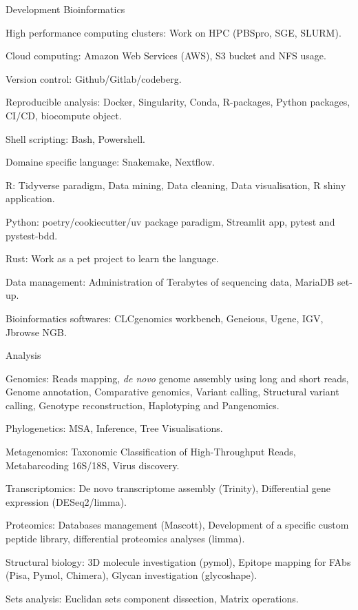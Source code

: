 \begin{cventries}
  \cventry
    {Development} %
    {Bioinformatics} %
    {} %
    {} %
    {
      \begin{cvitems} %
        \item {High performance computing clusters: Work on HPC (PBSpro, SGE, SLURM).}
        \item {Cloud computing: Amazon Web Services (AWS), S3 bucket and NFS usage.}
        \item {Version control: Github/Gitlab/codeberg.}
        \item {Reproducible analysis: Docker, Singularity, Conda, R-packages, Python packages, CI/CD, biocompute object.}
        \item {Shell scripting: Bash, Powershell.}
        \item {Domaine specific language: Snakemake, Nextflow.}
        \item {R: Tidyverse paradigm, Data mining, Data cleaning, Data visualisation, R shiny application.}
        \item {Python: poetry/cookiecutter/uv package paradigm, Streamlit app, pytest and pystest-bdd.}
        \item {Rust: Work as a pet project to learn the language.}
        \item {Data management: Administration of Terabytes of sequencing data, MariaDB set-up.}
        \item {Bioinformatics softwares: CLCgenomics workbench, Geneious, Ugene, IGV, Jbrowse NGB.}
      \end{cvitems}
    }

  \cventry
    {Analysis} %
    {} %
    {} %
    {} %
    {
      \begin{cvitems} %
        \item {Genomics: Reads mapping, \textit{de novo} genome assembly using long and short reads, Genome annotation, Comparative genomics, Variant calling, Structural variant calling, Genotype reconstruction, Haplotyping and Pangenomics.}
        \item {Phylogenetics: MSA, Inference, Tree Visualisations.}
        \item {Metagenomics: Taxonomic Classification of High-Throughput Reads, Metabarcoding 16S/18S, Virus discovery.}
        \item {Transcriptomics: De novo transcriptome assembly (Trinity), Differential gene expression (DESeq2/limma).}
        \item {Proteomics: Databases management (Mascott), Development of a specific custom peptide library, differential proteomics analyses (limma).}
        \item {Structural biology: 3D molecule investigation (pymol), Epitope mapping for FAbs (Pisa, Pymol, Chimera), Glycan investigation (glycoshape).}
        \item {Sets analysis: Euclidan sets component dissection, Matrix operations.}
      \end{cvitems}
    }


\end{cventries}